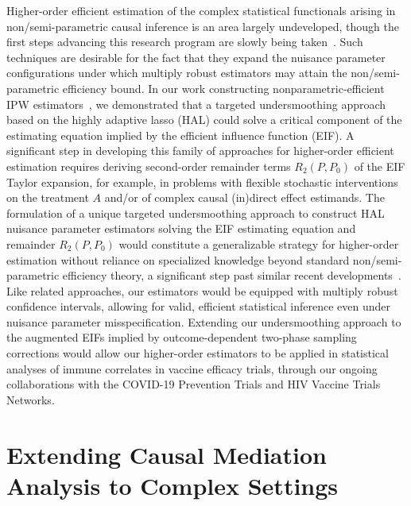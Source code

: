 Higher-order efficient estimation of the complex statistical functionals arising
in non/semi-parametric causal inference is an area largely undeveloped, though
the first steps advancing this research program are slowly being
taken~\citep{robins2008higher,carone2018higher}. Such techniques are desirable
for the fact that they expand the nuisance parameter configurations under which
multiply robust estimators may attain the non/semi-parametric efficiency bound.
In our work constructing nonparametric-efficient IPW
estimators~\citep{ertefaie2020nonparametric}, we demonstrated that a targeted
undersmoothing approach based on the highly adaptive lasso (HAL) could solve
a critical component of the estimating equation implied by the efficient
influence function (EIF). A significant step in developing this family of
approaches for higher-order efficient estimation requires deriving second-order
remainder terms $R_2(P, P_0)$ of the EIF Taylor expansion, for example, in
problems with flexible stochastic interventions on the treatment $A$ and/or of
complex causal (in)direct effect estimands. The formulation of a unique targeted
undersmoothing approach to construct HAL nuisance parameter estimators solving
the EIF estimating equation and remainder $R_2(P, P_0)$ would constitute
a generalizable strategy for higher-order estimation without reliance on
specialized knowledge beyond standard non/semi-parametric efficiency theory,
a significant step past similar recent developments~\citep{vdl2017generally,
benkeser2017doubly}. Like related approaches, our estimators would be equipped
with multiply robust confidence intervals, allowing for valid, efficient
statistical inference even under nuisance parameter misspecification. Extending
our undersmoothing approach to the augmented EIFs implied by outcome-dependent
two-phase sampling corrections would allow our higher-order estimators to be
applied in statistical analyses of immune correlates in vaccine efficacy trials,
through our ongoing collaborations with the COVID-19 Prevention Trials and HIV
Vaccine Trials Networks.

\section{Extending Causal Mediation Analysis to Complex Settings}

